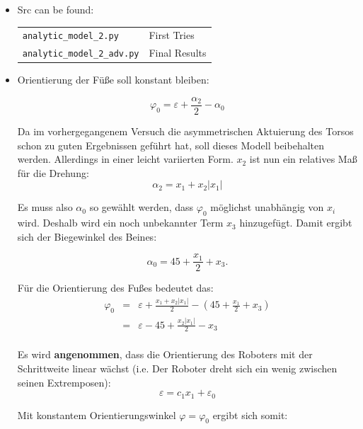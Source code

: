 \documentclass[10pt,a4paper]{article}
\begin{document}
\begin{itemize}

\item Src can be found:

	\begin{tabular}{ll}
		 \texttt{analytic\_model\_2.py} & First Tries \\
		 \texttt{analytic\_model\_2\_adv.py} & Final Results \\
	\end{tabular}

\item Orientierung der Füße soll konstant bleiben:

\begin{equation}
\varphi_0 = \varepsilon + \frac{\alpha_2}{2} - \alpha_0
\end{equation}

Da im vorhergegangenem Versuch die asymmetrischen Aktuierung des Torsos schon zu guten Ergebnissen geführt hat, soll dieses Modell beibehalten werden. Allerdings in einer leicht variierten Form. $x_2$ ist nun ein relatives Maß für die Drehung:
\begin{equation}
\alpha_2 = x_1 + x_2|x_1|
\end{equation}


Es muss also $\alpha_0$ so gewählt werden, dass $\varphi_0$ möglichst unabhängig von $x_i$ wird.
Deshalb wird ein noch unbekannter Term $x_3$ hinzugefügt. Damit ergibt sich der Biegewinkel des Beines:

\begin{equation}
\alpha_0 = 45+ \frac{x_1}{2} + x_3.
\end{equation}

Für die Orientierung des Fußes bedeutet das:
\begin{eqnarray}
\varphi_0 &=& \varepsilon + \frac{x_1 + x_2|x_1|}{2} - \left( 45 + \frac{x_1}{2} + x_3 \right) \\
			&=& \varepsilon -45 + \frac{x_2|x_1|}{2} -x_3 \\
\end{eqnarray}

Es wird \textbf{angenommen}, dass die Orientierung des Roboters mit der Schrittweite linear wächst (i.e. Der Roboter dreht sich ein wenig zwischen seinen Extremposen):
\begin{equation}
\varepsilon = c_1 x_1 + \varepsilon_0
\end{equation}

Mit konstantem Orientierungswinkel $\varphi = \varphi_0$ ergibt sich somit:


\end{itemize}
\end{document}
